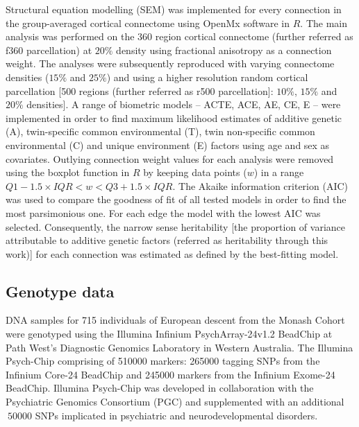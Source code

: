 Structural equation modelling (SEM) was implemented for every connection in the group-averaged cortical connectome using OpenMx software \citep{Boker2011,Neale2016} in $R$. The main analysis was performed on the 360 region \citep{Glasser2016} cortical connectome (further referred as f360 parcellation) at $20\%$ density using fractional anisotropy as a connection weight. The analyses were subsequently reproduced with varying connectome densities ($15\%$ and $25\%$) and using a higher resolution random cortical parcellation [500 regions (further referred as r500 parcellation]: $10\%$, $15\%$ and $20\%$ densities]. A range of biometric models -- ACTE, ACE, AE, CE, E -- were implemented in order to find maximum likelihood estimates of additive genetic (A), twin-specific common environmental (T), twin non-specific common environmental (C) and unique environment (E) factors using age and sex as covariates. Outlying connection weight values for each analysis were removed using the boxplot function in $R$ by keeping data points ($w$) in a range $Q1-1.5 \times IQR< w <Q3+1.5 \times IQR$. The Akaike information criterion (AIC) \citep{Akaike1998} was used to compare the goodness of fit of all tested models in order to find the most parsimonious one. For each edge the model with the lowest AIC was selected. Consequently, the narrow sense heritability [the proportion of variance attributable to additive genetic factors (referred as heritability through this work)] for each connection was estimated as defined by the best-fitting model.

\subsection{Genotype data}

DNA samples for 715 individuals of European descent from the Monash Cohort were genotyped using the Illumina Infinium PsychArray-24v1.2 BeadChip at Path West’s Diagnostic Genomics Laboratory in Western Australia. The Illumina Psych-Chip comprising of \num{510000} markers: \num{265000} tagging SNPs from the Infinium Core-24 BeadChip and \num{245000} markers from the Infinium Exome-24 BeadChip. Illumina Psych-Chip was developed in collaboration with the Psychiatric Genomics Consortium (PGC) and supplemented with an additional $~50000$ SNPs implicated in psychiatric and neurodevelopmental disorders.

